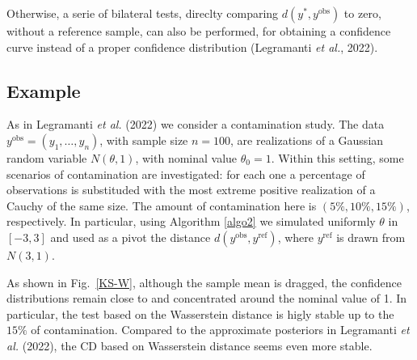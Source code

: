 \documentclass[preprint,12pt,authoryear]{elsarticle}
\begin{document}
Otherwise, a serie of bilateral tests, direclty comparing $d(y^*,y^{\text{obs}})$ to zero,  without a reference sample, can also be performed, for obtaining a confidence curve instead of a proper confidence distribution (Legramanti {\em et al.}, 2022).

 

\subsection{Example}

As in Legramanti {\em et al.} (2022) we consider a contamination study.
The data  $y^{\text{obs}}=(y_1,\ldots, y_n)$, with sample size  $n=100$, are realizations of a Gaussian random variable $N(\theta,1)$, with nominal value $\theta_0=1$. Within this setting, some scenarios of contamination are investigated: for each one a percentage of observations is substituded with the  most extreme positive realization of a Cauchy of the same size. The amount of contamination here is ${(5\%, 10\%, 15\%)}$, respectively.  In particular, using Algorithm \ref{algo2} we simulated uniformly $\theta$ in $[-3,3]$ and used as a pivot the distance $d(y^{\text {obs}}, y^{\text{ref}} )$, where $y^{\text{ref}}$ is drawn from $N(3,1)$. 

As shown in Fig.\ \ref{KS-W}, although the sample mean is dragged, the confidence distributions remain close to and concentrated around the nominal value of 1. In particular, the test based on the Wasserstein distance is  higly stable up to the $15\%$ of contamination.
Compared to the approximate posteriors in Legramanti {\em et al.} (2022), the CD based on Wasserstein distance seems even more stable. 
 
\end{document}

